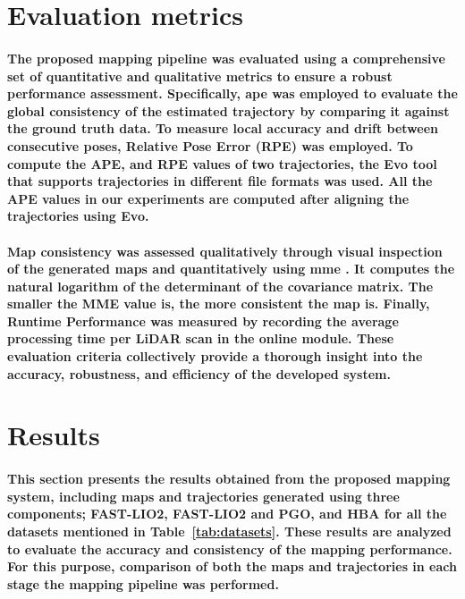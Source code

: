 \section{Evaluation metrics}
\label{sec:ev_metrics}
\paragraph{\textnormal{The proposed mapping pipeline was evaluated using a comprehensive set of quantitative and qualitative metrics to ensure a robust performance assessment. Specifically, \gls{ape} was employed to evaluate the global consistency of the estimated trajectory by comparing it against the ground truth data. To measure local accuracy and drift between consecutive poses, Relative Pose Error (RPE) was employed. To compute the APE, and RPE values of two trajectories, the Evo \cite{grupp2017evo} tool that supports trajectories in different file formats was used. All the APE values in our experiments are computed after aligning the trajectories using Evo. }}

\paragraph{\textnormal{Map consistency was assessed qualitatively through visual inspection of the generated maps and quantitatively using \gls{mme} \cite{7324196}. It computes the natural logarithm of the determinant of the covariance matrix. The smaller the MME value is, the more consistent the map is. Finally, Runtime Performance was measured by recording the average processing time per LiDAR scan in the online module. These evaluation criteria collectively provide a thorough insight into the accuracy, robustness, and efficiency of the developed system.
}}

\section{Results}
\label{sec:results}
\paragraph{\textnormal{This section presents the results obtained from the proposed mapping system, including maps and trajectories generated using three components; FAST-LIO2, FAST-LIO2 and PGO, and HBA for all the datasets mentioned in Table~\ref{tab:datasets}. These results are analyzed to evaluate the accuracy and consistency of the mapping performance. For this purpose, comparison of both the maps and trajectories in each stage the mapping pipeline was performed. 
}}
